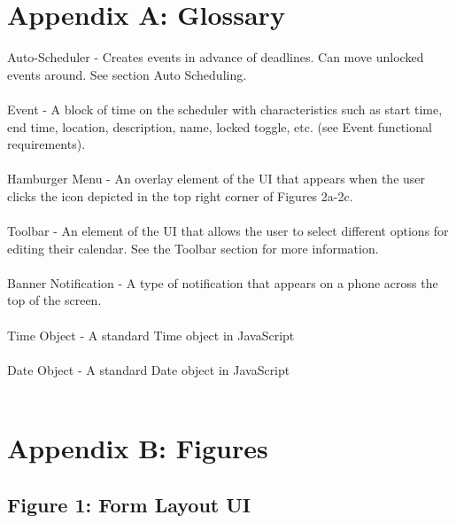 \documentclass{scrreprt}
\begin{document}
\chapter{Appendix A: Glossary}
Auto-Scheduler - Creates events in advance of deadlines. Can move unlocked events around. See section Auto Scheduling.\\
\\
Event - A block of time on the scheduler with characteristics such as start time, end time,
location, description, name, locked toggle, etc. (see Event functional requirements).\\
\\
Hamburger Menu - An overlay element of the UI that appears when the user clicks the icon depicted in the top right corner of Figures 2a-2c.\\
\\
Toolbar - An element of the UI that allows the user to select different options for editing their calendar.  See the Toolbar section for more information. \\
\\
Banner Notification - A type of notification that appears on a phone across the top of the screen. \\
\\
Time Object - A standard Time object in JavaScript \\
\\
Date Object - A standard Date object in JavaScript \\
\\
\chapter{Appendix B: Figures}

\section{Figure 1: Form Layout UI}
\end{document}
